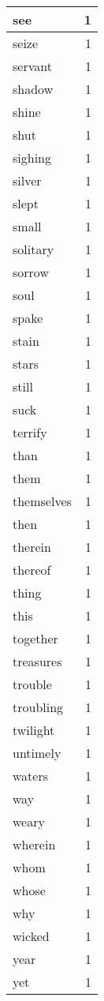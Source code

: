 \begin{center}
\begin{longtable}{l|r}
see & 1 \\ \hline
seize & 1 \\ \hline
servant & 1 \\ \hline
shadow & 1 \\ \hline
shine & 1 \\ \hline
shut & 1 \\ \hline
sighing & 1 \\ \hline
silver & 1 \\ \hline
slept & 1 \\ \hline
small & 1 \\ \hline
solitary & 1 \\ \hline
sorrow & 1 \\ \hline
soul & 1 \\ \hline
spake & 1 \\ \hline
stain & 1 \\ \hline
stars & 1 \\ \hline
still & 1 \\ \hline
suck & 1 \\ \hline
terrify & 1 \\ \hline
than & 1 \\ \hline
them & 1 \\ \hline
themselves & 1 \\ \hline
then & 1 \\ \hline
therein & 1 \\ \hline
thereof & 1 \\ \hline
thing & 1 \\ \hline
this & 1 \\ \hline
together & 1 \\ \hline
treasures & 1 \\ \hline
trouble & 1 \\ \hline
troubling & 1 \\ \hline
twilight & 1 \\ \hline
untimely & 1 \\ \hline
waters & 1 \\ \hline
way & 1 \\ \hline
weary & 1 \\ \hline
wherein & 1 \\ \hline
whom & 1 \\ \hline
whose & 1 \\ \hline
why & 1 \\ \hline
wicked & 1 \\ \hline
year & 1 \\ \hline
yet & 1 \\ \hline
\end{longtable}
\end{center}



